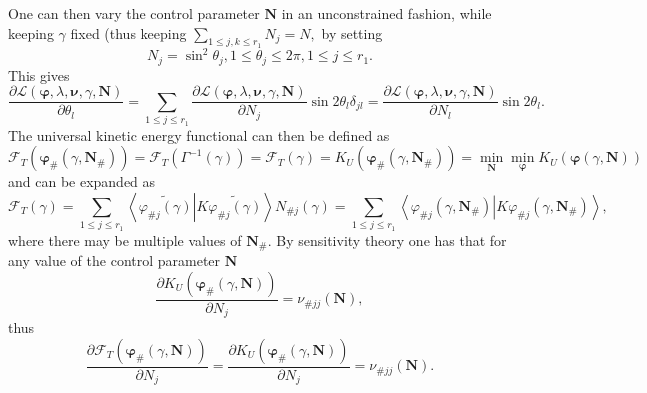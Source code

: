 \documentclass[aps,preprint]{revtex4}%
\begin{document}
One can then vary the control parameter $\mathbf{N}$ in an unconstrained
fashion, while keeping $\gamma$ fixed (thus keeping $\sum_{1\leq j,k\leq
r_{1}}N_{j}=N,$ by setting
\begin{equation}
N_{j}=\sin^{2}\theta_{j},1\leq\theta_{j}\leq2\pi,1\leq j\leq r_{1}.
\end{equation}
This gives
\begin{equation}
\frac{\partial\mathcal{L}\left(  \mathbf{\varphi},\lambda,\mathbf{\nu}%
,\gamma,\mathbf{N}\right)  }{\partial\theta_{l}}=\sum_{1\leq j\leq r_{1}}%
\frac{\partial\mathcal{L}\left(  \mathbf{\varphi},\lambda,\mathbf{\nu}%
,\gamma,\mathbf{N}\right)  }{\partial N_{j}}\sin2\theta_{l}\delta_{jl}%
=\frac{\partial\mathcal{L}\left(  \mathbf{\varphi},\lambda,\mathbf{\nu}%
,\gamma,\mathbf{N}\right)  }{\partial N_{l}}\sin2\theta_{l}.
\end{equation}
The universal kinetic energy functional can then be defined as
\begin{equation}
\mathcal{F}_{T}\left(  \mathbf{\varphi}_{\#}\left(  \gamma,\mathbf{N}%
_{\#}\right)  \right)  =\mathcal{F}_{T}\left(  \Gamma^{-1}\left(
\gamma\right)  \right)  =\mathcal{F}_{T}\left(  \gamma\right)  =K_{U}\left(
\mathbf{\varphi}_{\#}\left(  \gamma,\mathbf{N}_{\#}\right)  \right)
=\min_{\mathbf{N}}\min_{\mathbf{\varphi}}K_{U}\left(  \mathbf{\varphi}\left(
\gamma,\mathbf{N}\right)  \right)
\end{equation}
and can be expanded as
\begin{equation}
\mathcal{F}_{T}\left(  \gamma\right)  =\sum_{1\leq j\leq r_{1}}\left\langle
\widetilde{\varphi_{\#j}\left(  \gamma\right)  }\left\vert K\widetilde
{\varphi_{\#j}\left(  \gamma\right)  }\right.  \right\rangle N_{\#j}\left(
\gamma\right)  =\sum_{1\leq j\leq r_{1}}\left\langle \varphi_{\#j}\left(
\gamma,\mathbf{N}_{\#}\right)  \left\vert K\varphi_{\#j}\left(  \gamma
,\mathbf{N}_{\#}\right)  \right.  \right\rangle ,
\end{equation}
where there may be multiple values of $\mathbf{N}_{\#}$. By sensitivity theory
one has that for any value of the control parameter $\mathbf{N}$
\begin{equation}
\frac{\partial K_{U}\left(  \mathbf{\varphi}_{\#}\left(  \gamma,\mathbf{N}%
\right)  \right)  }{\partial N_{j}}=\nu_{\#jj}\left(  \mathbf{N}\right)  ,
\end{equation}
thus
\begin{equation}
\frac{\partial\mathcal{F}_{T}\left(  \mathbf{\varphi}_{\#}\left(
\gamma,\mathbf{N}\right)  \right)  }{\partial N_{j}}=\frac{\partial
K_{U}\left(  \mathbf{\varphi}_{\#}\left(  \gamma,\mathbf{N}\right)  \right)
}{\partial N_{j}}=\nu_{\#jj}\left(  \mathbf{N}\right)  .
\end{equation}
\end{document}
